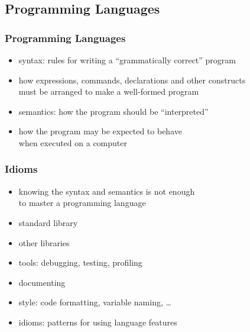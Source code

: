 \documentclass[dvipsnames]{beamer}
\theoremstyle{plain}
\begin{document}
\subsection{Programming Languages}

\begin{frame}
  \frametitle{Programming Languages}

  \begin{itemize}
    \item \alert{syntax}: rules for writing a ``grammatically correct'' program
    \item how expressions, commands, declarations and other constructs\\
      must be arranged to make a well-formed program

    \pause
    \bigskip
    \item \alert{semantics}: how the program should be ``interpreted''
    \item how the program may be expected to behave\\
      when executed on a computer
  \end{itemize}
\end{frame}

\begin{frame}
  \frametitle{Idioms}

  \begin{itemize}
    \item knowing the syntax and semantics is not enough\\
      to master a programming language

    \medskip
    \item standard library
    \item other libraries
    \item tools: debugging, testing, profiling
    \item documenting
    \item style: code formatting, variable naming, \ldots

    \pause
    \medskip
    \item \alert{idioms}: patterns for using language features
  \end{itemize}
\end{frame}
\end{document}
